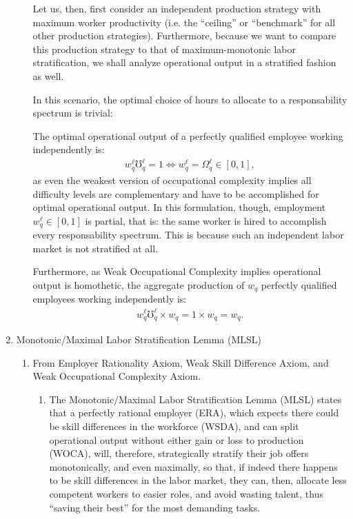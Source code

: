 \documentclass[hidelinks, nonatbib]{elsarticle}
\begin{document}
\begin{enumerate}
\begin{enumerate}
        Let us, then, first consider an independent production strategy with maximum worker productivity (i.e. the ``ceiling'' or ``benchmark'' for all other production strategies). Furthermore, because we want to compare this production strategy to that of maximum-monotonic labor stratification, we shall analyze operational output in a stratified fashion as well.

        In this scenario, the optimal choice of hours to allocate to a responsability spectrum is trivial:

        The optimal operational output of a perfectly qualified employee working independently is:
        \begin{gather}
            w_{q}^{\ell}
            \mho_{q}^{\ell}
            =
            1
            \iff
            w_{q}^{\ell}
            =
            \Omega_{q}^{\ell}
            \in [0,1]
            ,
        \end{gather}
        as even the weakest version of occupational complexity implies all difficulty levels are complementary and have to be accomplished for optimal operational output.
        In this formulation, though, employment $w_{q}^{\ell} \in [0,1]$ is partial, that is: the same worker is hired to accomplish every responsability spectrum. This is because such an independent labor market is not stratified at all.

        Furthermore, as Weak Occupational Complexity implies operational output is homothetic, the aggregate production of $w_q$ perfectly qualified employees working independently is:
        \begin{gather}
            w_{q}^{\ell}
            \mho_{q}^{\ell}
            \times
            w_q
            =
            1
            \times
            w_q
            =
            w_q
            .
        \end{gather}
    \end{enumerate}
    \item Monotonic/Maximal Labor Stratification Lemma (MLSL)
    \begin{enumerate}
        \item From Employer Rationality Axiom, Weak Skill Difference Axiom, and Weak Occupational Complexity Axiom.
        \begin{enumerate}
            \item The Monotonic/Maximal Labor Stratification Lemma (MLSL) states that a perfectly rational employer (ERA), which expects there could be skill differences in the workforce (WSDA), and can split operational output without either gain or loss to production (WOCA), will, therefore, strategically stratify their job offers monotonically, and even maximally, so that, if indeed there happens to be skill differences in the labor market, they can, then, allocate less competent workers to easier roles, and avoid wasting talent, thus ``saving their best'' for the most demanding tasks.
            

\end{enumerate}
\end{enumerate}
\end{enumerate}
\end{document}

